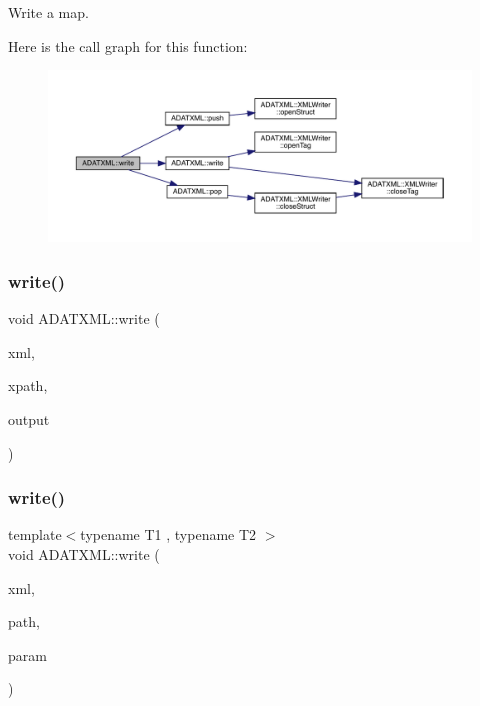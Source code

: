 Write a map. 

Here is the call graph for this function\+:\nopagebreak
\begin{figure}[H]
\begin{center}
\leavevmode
\includegraphics[width=350pt]{d2/da3/group__io_gaab13ff0d8972a4435cd3590b6c87ea05_cgraph}
\end{center}
\end{figure}
\mbox{\label{group__io_ga9a93f3084bfa9501e5fb5da53925c25d}} 
\subsubsection{\texorpdfstring{write()}{write()}\hspace{0.1cm}{\footnotesize\ttfamily [30/58]}}
{\footnotesize\ttfamily void A\+D\+A\+T\+X\+M\+L\+::write (\begin{DoxyParamCaption}\item[{\mbox{\hyperlink{classADATXML_1_1XMLWriter}{X\+M\+L\+Writer}} \&}]{xml,  }\item[{const std\+::string \&}]{xpath,  }\item[{const \mbox{\hyperlink{classXMLArray_1_1Array}{Array}}$<$ bool $>$ \&}]{output }\end{DoxyParamCaption})}

\mbox{\label{group__io_gabcda0d5bebd682903ae663861766df8b}} 
\subsubsection{\texorpdfstring{write()}{write()}\hspace{0.1cm}{\footnotesize\ttfamily [31/58]}}
{\footnotesize\ttfamily template$<$typename T1 , typename T2 $>$ \\
void A\+D\+A\+T\+X\+M\+L\+::write (\begin{DoxyParamCaption}\item[{\mbox{\hyperlink{classADATXML_1_1XMLWriter}{X\+M\+L\+Writer}} \&}]{xml,  }\item[{const std\+::string \&}]{path,  }\item[{const std\+::pair$<$ T1, T2 $>$ \&}]{param }\end{DoxyParamCaption})\hspace{0.3cm}{\ttfamily [inline]}}



